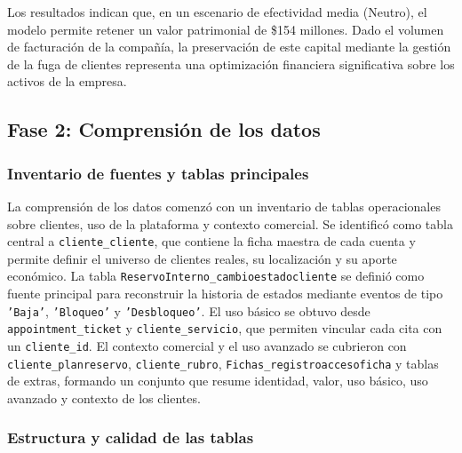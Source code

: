 Los resultados indican que, en un escenario de efectividad media (Neutro), el modelo permite retener un valor patrimonial de \$154 millones. Dado el volumen de facturación de la compañía, la preservación de este capital mediante la gestión de la fuga de clientes representa una optimización financiera significativa sobre los activos de la empresa.

\subsection{Fase 2: Comprensión de los datos}

\subsubsection{Inventario de fuentes y tablas principales}

La comprensión de los datos comenzó con un inventario de tablas operacionales sobre clientes, uso de la plataforma y contexto comercial. Se identificó como tabla central a \texttt{cliente\_\hspace{0pt}cliente}, que contiene la ficha maestra de cada cuenta y permite definir el universo de clientes reales, su localización y su aporte económico. La tabla \texttt{ReservoInterno\_\hspace{0pt}cambioestadocliente} se definió como fuente principal para reconstruir la historia de estados mediante eventos de tipo \texttt{'Baja'}, \texttt{'Bloqueo'} y \texttt{'Desbloqueo'}. El uso básico se obtuvo desde \texttt{appointment\_\hspace{0pt}ticket} y \texttt{cliente\_\hspace{0pt}servicio}, que permiten vincular cada cita con un \texttt{cliente\_\hspace{0pt}id}. El contexto comercial y el uso avanzado se cubrieron con \texttt{cliente\_\hspace{0pt}planreservo}, \texttt{cliente\_\hspace{0pt}rubro}, \texttt{Fichas\_\hspace{0pt}registroaccesoficha} y tablas de extras, formando un conjunto que resume identidad, valor, uso básico, uso avanzado y contexto de los clientes.

\subsubsection{Estructura y calidad de las tablas}

